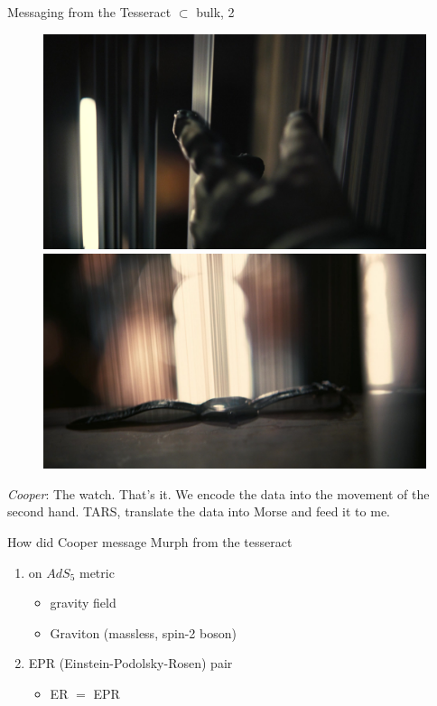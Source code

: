 \documentclass{beamer}
\begin{document}
\begin{frame}{Messaging from the Tesseract $\subset$ bulk, 2}
	
		\begin{figure}[!htb]
	\includegraphics[width=1.5\linewidth]{images/1201440.jpg} 
	\endminipage\hfill
	\includegraphics[width=1.5\linewidth]{images/1201442.jpg}
	\endminipage\hfill
\end{figure}

\emph{Cooper}: The watch. That's it. We encode the data into the movement of the second hand. TARS, translate the data into Morse and feed it to me.
	
\end{frame}



\begin{frame}{How did Cooper message Murph from the tesseract}

\begin{enumerate}
\item on $AdS_5$ metric
	\begin{itemize}
		\item gravity field
		\item Graviton (massless, spin-2 boson)
	\end{itemize}
\item EPR (Einstein-Podolsky-Rosen) pair
\begin{itemize}
	\item ER $=$ EPR
\end{itemize}
\end{enumerate}
\end{frame}
\end{document}
